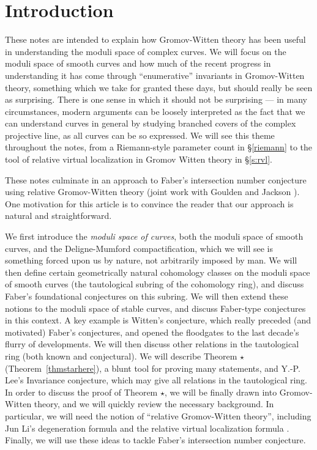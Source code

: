 \documentclass[12pt,letterpaper]{amsart}
\begin{document}
{\parskip=12pt %

\section{Introduction}
These notes are intended to explain how Gromov-Witten theory has been
useful in understanding the moduli space of complex curves.  
We will focus on the
moduli space of smooth curves and how much of the recent progress in
understanding it has come through ``enumerative'' invariants in
Gromov-Witten theory, something which we take for granted these days,
but should really be seen as surprising.  There is one sense in which
it should not be surprising --- in many circumstances, modern
arguments can be loosely interpreted as the fact that we can
understand curves in general by studying branched covers of the
complex projective line, as all curves can be so expressed.  We will
see this theme throughout the notes, from a Riemann-style parameter
count in \S \ref{riemann} to the tool of relative virtual localization
in Gromov Witten theory in \S \ref{s:rvl}.

These notes culminate in an approach to Faber's
intersection number conjecture using relative Gromov-Witten theory
(joint work with Goulden and Jackson \cite{gjv}).  One motivation for
this article is to convince the reader that our approach is natural and
straightforward.

We first introduce the {\em moduli space of curves}, both the moduli
space of smooth curves, and the Deligne-Mumford compactification,
which we will see is something forced upon us by nature, not
arbitrarily imposed by man.  We will then define certain geometrically
natural cohomology classes on the moduli space of smooth curves (the
tautological subring of the cohomology ring), and discuss Faber's
foundational conjectures on this subring.  We will then extend these
notions to the moduli space of stable curves, and discuss Faber-type
conjectures in this context.  A key example is Witten's conjecture,
which really preceded (and motivated) Faber's conjectures, and opened
the floodgates to the last decade's flurry of developments.  We will
then discuss other relations in the tautological ring (both known and
conjectural).  We will describe Theorem $\star$
(Theorem~\ref{thmstarhere}), a blunt tool for proving many statements,
and Y.-P. Lee's Invariance conjecture, which may give all relations in
the tautological ring.  In order to discuss the proof of Theorem
$\star$, we will be finally drawn into Gromov-Witten theory, and we
will quickly review the necessary background.  In particular, we will
need the notion of ``relative Gromov-Witten theory'', including Jun Li's
degeneration formula \cite{li1, li2} and the relative virtual
localization formula \cite{thmstar}.  Finally, we will use these ideas
to tackle Faber's intersection number conjecture.

}
\end{document}
